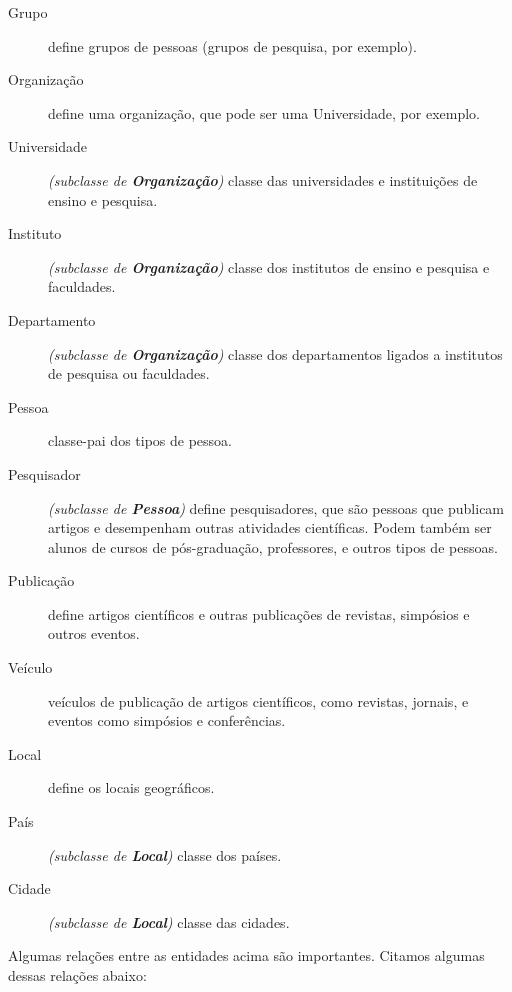 \begin{description}
  \item[Grupo] define grupos de pessoas (grupos de pesquisa, por exemplo).
  \item[Organização] define uma organização, que pode ser uma Universidade, por
  exemplo.
  \item[Universidade] \emph{(subclasse de \textbf{Organização})} classe das universidades e instituições de ensino e pesquisa.
  \item[Instituto] \emph{(subclasse de \textbf{Organização})} classe dos institutos de ensino e pesquisa e faculdades.
  \item[Departamento] \emph{(subclasse de \textbf{Organização})} classe dos departamentos ligados a institutos de pesquisa ou faculdades.
  \item[Pessoa] classe-pai dos tipos de pessoa.
  \item[Pesquisador] \emph{(subclasse de \textbf{Pessoa})} define pesquisadores, que são pessoas que publicam artigos e desempenham outras atividades científicas. Podem também ser alunos de cursos de pós-graduação, professores, e outros tipos de pessoas.
  \item[Publicação] define artigos científicos e outras publicações de
  revistas, simpósios e outros eventos.
  \item[Veículo] veículos de publicação de artigos científicos, como revistas, jornais, e eventos como simpósios e conferências.
  \item[Local] define os locais geográficos.
  \item[País] \emph{(subclasse de \textbf{Local})} classe dos países.
  \item[Cidade] \emph{(subclasse de \textbf{Local})} classe das cidades.
\end{description}

Algumas relações entre as entidades acima são importantes. Citamos algumas dessas relações abaixo:

